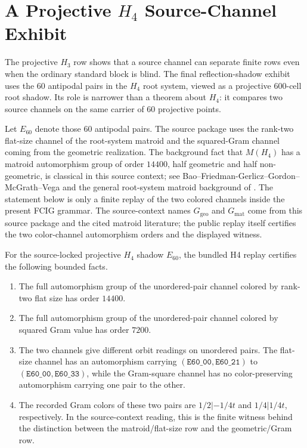 \section{A Projective \texorpdfstring{\(H_4\)}{H4} Source-Channel Exhibit}
\label{sec:h4-source-channel}

The projective \(H_3\) row shows that a source channel can separate finite rows even when the ordinary standard block is blind.  The final reflection-shadow exhibit uses the 60 antipodal pairs in the \(H_4\) root system, viewed as a projective 600-cell root shadow.  Its role is narrower than a theorem about \(H_4\): it compares two source channels on the same carrier of 60 projective points.

Let \(E_{60}\) denote those 60 antipodal pairs.  The source package uses the rank-two flat-size channel of the root-system matroid and the squared-Gram channel coming from the geometric realization.  The background fact that \(M(H_4)\) has a matroid automorphism group of order \(14400\), half geometric and half non-geometric, is classical in this source context; see Bao--Friedman-Gerlicz--Gordon--McGrath--Vega\cite{BaoFreidmanGerliczGordonMcGrathVega2010H4Matroid} and the general root-system matroid background of \cite{DutourSikiricFeliksonTumarkin2008RootMatroids}.  The statement below is only a finite replay of the two colored channels inside the present FCIG grammar.  The source-context names \(G_{\mathrm{geo}}\) and \(G_{\mathrm{mat}}\) come from this source package and the cited matroid literature; the public replay itself certifies the two color-channel automorphism orders and the displayed witness.

\begin{proposition}
\label{prop:h4-source-channel}
For the source-locked projective \(H_4\) shadow \(E_{60}\), the bundled H4 replay certifies the following bounded facts.
\begin{enumerate}[label=\textup{(\alph*)},leftmargin=*]
  \item The full automorphism group of the unordered-pair channel colored by rank-two flat size has order \(14400\).
  \item The full automorphism group of the unordered-pair channel colored by squared Gram value has order \(7200\).
  \item The two channels give different orbit readings on unordered pairs.  The flat-size channel has an automorphism carrying \((\texttt{E60\_00},\texttt{E60\_21})\) to \((\texttt{E60\_00},\texttt{E60\_33})\), while the Gram-square channel has no color-preserving automorphism carrying one pair to the other.
  \item The recorded Gram colors of these two pairs are \(1/2|-1/4t\) and \(1/4|1/4t\), respectively.  In the source-context reading, this is the finite witness behind the distinction between the matroid/flat-size row and the geometric/Gram row.
\end{enumerate}
\end{proposition}

